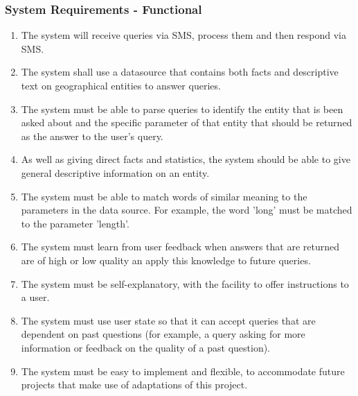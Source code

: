 \documentclass{article}
\begin{document}
\subsubsection{System Requirements - Functional}
\label{subsubsec:systemRequirementsFunctional}
\begin{enumerate}
  \item The system will receive queries via SMS, process them and then respond via SMS.
  \item The system shall use a datasource that contains both facts and descriptive text on geographical entities to answer queries.
  \item The system must be able to parse queries to identify the entity that is been asked about and the specific parameter of that entity that should be returned as the answer to the user's query.
  \item As well as giving direct facts and statistics, the system should be able to give general descriptive information on an entity.
  \item The system must be able to match words of similar meaning to the parameters in the data source.  For example, the word 'long' must be matched to the parameter 'length'.
  \item The system must learn from user feedback when answers that are returned are of high or low quality an apply this knowledge to future queries.
  \item The system must be self-explanatory, with the facility to offer instructions to a user.
  \item The system must use user state so that it can accept queries that are dependent on past questions (for example, a query asking for more information or feedback on the quality of a past question).
  \item \label{requirement:easyToImplement} The system must be easy to implement and flexible, to accommodate future projects that make use of adaptations of this project.
\end{enumerate}
\end{document}

